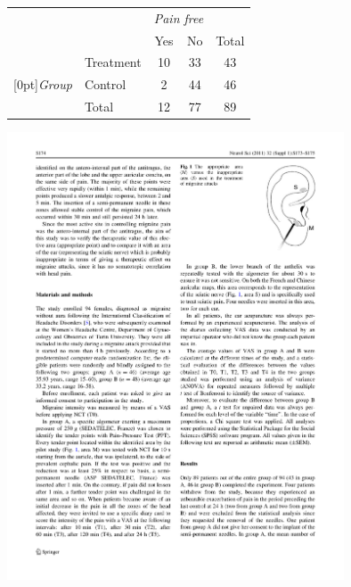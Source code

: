 {\noindent\begin{minipage}[l]{0.4\textwidth}
\begin{tabular}{ll  cc c} 
			                         &           & \multicolumn{2}{c}{\textit{Pain free}} \\
\cline{3-4}
			                         &			 & Yes 	    & No 	                      & Total	\\
\cline{2-5}
							         & Treatment & 10	 	& 33		                  & 43 	\\
\raisebox{1.5ex}[0pt]{\emph{Group}}  & Control	 & 2	 	& 44 	 	                  & 46 \\
\cline{2-5}
							         &Total		 & 12		& 77		                  & 89
\end{tabular}
\end{minipage}
\begin{minipage}[c]{0.05\textwidth}
\end{minipage}
\begin{minipage}[c]{0.27\textwidth}
\begin{center}
\includegraphics[width = 0.75\textwidth]{ch_intro_to_data/figures/eoce/migraine_and_acupuncture_intro/earacupuncture.pdf}
\end{center}
\end{minipage}
\begin{minipage}[c]{0.25\textwidth}

\end{minipage}}
